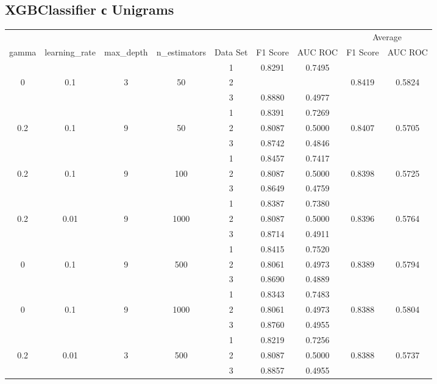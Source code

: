 \documentclass[12pt, twoside]{article}
\begin{document}
\subsection{XGBClassifier с Unigrams}
\begin{landscape}
\begin{table}[!htbp]
  \centering
  \begin{tabular}{ccccccccc}
  \toprule
  {}	&	{}	&	{}	&	{}	&	{}	&	{}	&	{}	&	\multicolumn{2}{c}{Average} \\
  \cmidrule(r){8-9}
  gamma	&	learning\_rate	&	max\_depth	&	n\_estimators	&	Data Set	&	F1 Score	&	AUC ROC	&	F1 Score	&	AUC ROC \\
  \midrule
  	&	&	&	&	1	&	0.8291	&	0.7495	&		&	 \\
  0	&	0.1	&	3	&	50	&	2	&		&		&	0.8419	&	0.5824 \\
  	&	&	&	&	3	&	0.8880	&	0.4977	&		&	 \\
  	\cmidrule(r){5-9}
  	&	&	&	&	1	&	0.8391	&	0.7269	&		&	 \\
  0.2	&	0.1	&	9	&	50	&	2	&	0.8087	&	0.5000	&	0.8407	&	0.5705 \\
  	&	&	&	&	3	&	0.8742	&	0.4846 	&		&	 \\
  	\cmidrule(r){5-9}
  	&	&	&	&	1	&	0.8457	&	0.7417	&		&	 \\
  0.2	&	0.1	&	9	&	100	&	2	&	0.8087	&	0.5000	&	0.8398	&	0.5725 \\
  	&	&	&	&	3	&	0.8649	&	0.4759	&		&	 \\
  	\cmidrule(r){5-9}
  	&	&	&	&	1	&	0.8387	&	0.7380	&		&	 \\
  0.2	&	0.01	&	9	&	1000	&	2	&	0.8087	&	0.5000	&	0.8396	&	0.5764 \\
  	&	&	&	&	3	&	0.8714	&	0.4911	&		&	 \\
  	\cmidrule(r){5-9}
  	&	&	&	&	1	&	0.8415	&	0.7520	&		&	 \\
  0	&	0.1	&	9	&	500	&	2	&	0.8061	&	0.4973	&	0.8389	&	0.5794 \\
  	&	&	&	&	3	&	0.8690	&	0.4889	&		&	 \\
  	\cmidrule(r){5-9}
  	&	&	&	&	1	&	0.8343	&	0.7483	&		&	 \\
  0	&	0.1	&	9	&	1000	&	2	&	0.8061	&	0.4973	&	0.8388	&	0.5804 \\
  	&	&	&	&	3	&	0.8760	&	0.4955	&		&	 \\
  	\cmidrule(r){5-9}
  	&	&	&	&	1	&	0.8219	&	0.7256	&		&	 \\
  0.2	&	0.01	&	3	&	500	&	2	&	0.8087	&	0.5000	&	0.8388	&	0.5737 \\
  	&	&	&	&	3	&	0.8857	&	0.4955	&		&	 \\

\end{tabular}
\end{table}
\end{landscape}
\end{document}
